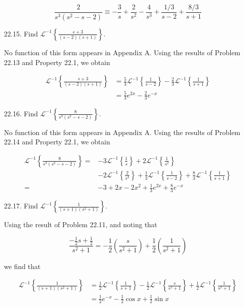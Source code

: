 \documentclass[10pt]{article}
\begin{document}
$$
\frac{2}{s^{3}\left(s^{2}-s-2\right)} \equiv-\frac{3}{s}+\frac{2}{s^{2}}-\frac{4}{s^{3}}+\frac{1 / 3}{s-2}+\frac{8 / 3}{s+1}
$$

22.15. Find $\mathscr{L}^{-1}\left\{\frac{s+3}{(s-2)(s+1)}\right\}$.

No function of this form appears in Appendix A. Using the results of Problem 22.13 and Property 22.1, we obtain

$$
\begin{aligned}
\mathscr{L}^{-1}\left\{\frac{s+3}{(s-2)(s+1)}\right\} & =\frac{5}{3} \mathscr{L}^{-1}\left\{\frac{1}{s-2}\right\}-\frac{2}{3} \mathscr{L}^{-1}\left\{\frac{1}{s+1}\right\} \\
& =\frac{5}{3} e^{2 x}-\frac{2}{3} e^{-x}
\end{aligned}
$$

22.16. Find $\mathscr{L}^{-1}\left\{\frac{8}{s^{3}\left(s^{2}-s-2\right)}\right\}$.

No function of this form appears in Appendix A. Using the results of Problem 22.14 and Property 22.1, we obtain

$$
\begin{aligned}
\mathscr{L}^{-1}\left\{\frac{8}{s^{3}\left(s^{2}-s-2\right)}\right\}= & -3 \mathscr{L}^{-1}\left\{\frac{1}{s}\right\}+2 \mathscr{L}^{-1}\left\{\frac{1}{s^{2}}\right\} \\
& -2 \mathscr{L}^{-1}\left\{\frac{2}{s^{3}}\right\}+\frac{1}{3} \mathscr{L}^{-1}\left\{\frac{1}{s-2}\right\}+\frac{8}{3} \mathscr{L}^{-1}\left\{\frac{1}{s+1}\right\} \\
= & -3+2 x-2 x^{2}+\frac{1}{3} e^{2 x}+\frac{8}{3} e^{-x}
\end{aligned}
$$

22.17. Find $\mathscr{L}^{-1}\left\{\frac{1}{(s+1)\left(s^{2}+1\right)}\right\}$.

Using the result of Problem 22.11, and noting that

$$
\frac{-\frac{1}{2} s+\frac{1}{2}}{s^{2}+1}=-\frac{1}{2}\left(\frac{s}{s^{2}+1}\right)+\frac{1}{2}\left(\frac{1}{s^{2}+1}\right)
$$

we find that

$$
\begin{aligned}
\mathscr{L}^{-1}\left\{\frac{1}{(s+1)\left(s^{2}+1\right)}\right\} & =\frac{1}{2} \mathscr{L}^{-1}\left\{\frac{1}{s+1}\right\}-\frac{1}{2} \mathscr{L}^{-1}\left\{\frac{s}{s^{2}+1}\right\}+\frac{1}{2} \mathscr{L}^{-1}\left\{\frac{1}{s^{2}+1}\right\} \\
& =\frac{1}{2} e^{-x}-\frac{1}{2} \cos x+\frac{1}{2} \sin x
\end{aligned}
$$
\end{document}
